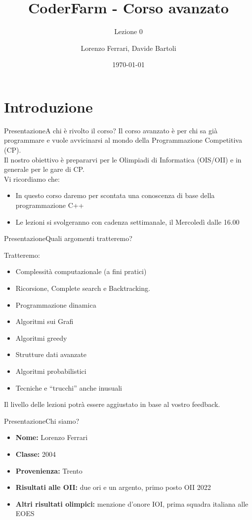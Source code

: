 \documentclass{beamer}
\title{CoderFarm - Corso avanzato}
\subtitle{Lezione 0}
\author{Lorenzo Ferrari, Davide Bartoli}
\date{\today}
\begin{document}
\begin{frame}
    \titlepage
\end{frame}

\section{Introduzione}
\begin{frame}{Presentazione}{A chi è rivolto il corso?}
    Il corso avanzato \`e per chi sa gi\`a programmare e vuole avvicinarsi al mondo della Programmazione Competitiva (CP). \\
    Il nostro obiettivo \`e prepararvi per le Olimpiadi di Informatica (OIS/OII) e in generale per le gare di CP. \\
    \smallbreak
    Vi ricordiamo che:
    \begin{itemize}
        \item In questo corso daremo per scontata una conoscenza di base della programmazione C++
        \item Le lezioni si svolgeranno con cadenza settimanale, il Mercoled\`i dalle 16.00
    \end{itemize}
\end{frame}

\begin{frame}{Presentazione}{Quali argomenti tratteremo?}
    \begin{block}{Tratteremo:}
        \begin{itemize}
            \item Complessit\`a computazionale (a fini pratici)
            \item Ricorsione, Complete search e Backtracking.
            \item Programmazione dinamica
            \item Algoritmi sui Grafi
            \item Algoritmi greedy
            \item Strutture dati avanzate
            \item Algoritmi probabilistici
            \item Tecniche e ``trucchi'' anche inusuali
        \end{itemize}
    \end{block}
    Il livello delle lezioni potr\`a essere aggiustato in base al vostro feedback.
\end{frame}

\begin{frame}{Presentazione}{Chi siamo?}
    \begin{itemize}
        \item \textbf{Nome:} Lorenzo Ferrari
        \item \textbf{Classe:} 2004
        \item \textbf{Provenienza:} Trento
        \item \textbf{Risultati alle OII:} due ori e un argento, primo posto OII 2022
        \item \textbf{Altri risultati olimpici:} menzione d'onore IOI, prima squadra italiana alle EOES
    \end{itemize}
\end{frame}
\end{document}
